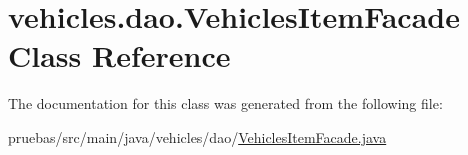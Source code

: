 \hypertarget{classvehicles_1_1dao_1_1_vehicles_item_facade}{}\section{vehicles.\+dao.\+Vehicles\+Item\+Facade Class Reference}
\label{classvehicles_1_1dao_1_1_vehicles_item_facade}


The documentation for this class was generated from the following file\+:\begin{DoxyCompactItemize}
\item 
pruebas/src/main/java/vehicles/dao/\mbox{\hyperlink{_vehicles_item_facade_8java}{Vehicles\+Item\+Facade.\+java}}\end{DoxyCompactItemize}

